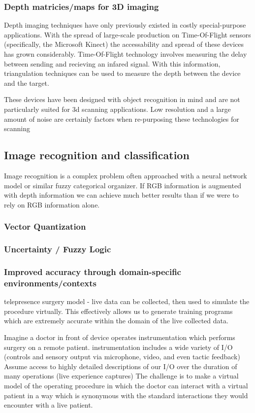 \documentclass[a4paper,12pt]{report}
\begin{document}
\cite{5397590}
\subsubsection{Depth matricies/maps for 3D imaging}
Depth imaging techniques have only previously existed in costly special-purpose applications. With the spread of large-scale production on Time-Of-Flight sensors (specifically, the Microsoft Kinect) the accessability and spread of these devices has grown considerably. Time-Of-Flight technology involves measuring the delay between sending and recieving an infared signal. With this information, triangulation techniques can be used to measure the depth between the device and the target. 

These devices have been designed with object recognition in mind and are not particularly suited for 3d scanning applications. Low resolution and a large amount of noise are certainly factors when re-purposing these technologies for scanning\cite{6296662} 
\subsection{Image recognition and classification}
Image recognition is a complex problem often approached with a neural network model or similar fuzzy categorical organizer. If RGB information is augmented with depth information we can achieve much better results than if we were to rely on RGB information alone.
\subsubsection{Vector Quantization}
\subsubsection{Uncertainty / Fuzzy Logic}
\subsubsection{Improved accuracy through domain-specific environments/contexts}
telepresence surgery model - live data can be collected, then used to simulate the procedure virtually. 
This effectively allows us to generate training programs which are extremely accurate within the domain of the live collected data.

Imagine a doctor in front of device operates instrumentation which performs surgery on a remote patient.
instrumentation includes a wide variety of I/O (controls and sensory output via microphone, video, and even tactic feedback)
Assume access to highly detailed descriptions of our I/O over the duration of many operations (live experience captures)
The challenge is to make a virtual model of the operating procedure in which the doctor can interact with a virtual patient in a way which is synonymous with the standard interactions they would encounter with a live patient.
\end{document}

